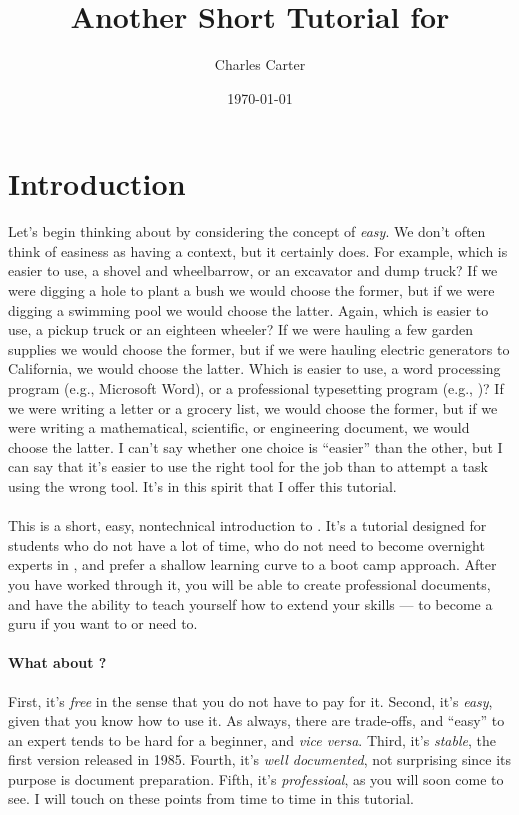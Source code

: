 \documentclass[letterpaper]{article}
\title{Another Short Tutorial for \LaTeXe}
\author{Charles Carter}
\date{\today{}}
\newcommand{\Lx}{\LaTeXe}
\begin{document}
    \maketitle{}
    
    \tableofcontents{}
    \listoffigures{}
    \listoftables{}

    \newpage{}

    \section{Introduction}
    \label{Introduction}

    Let's begin thinking about \Lx{}  by considering the concept of \textit{easy}. We don't often think of easiness as having a context, but it certainly does. For example, which is easier to use, a shovel and wheelbarrow, or an excavator and dump truck? If we were digging a hole to plant a bush we would choose the former, but if we were digging a swimming pool we would choose the latter. Again, which is easier to use, a pickup truck or an eighteen wheeler? If we were hauling a few garden supplies we would choose the former, but if we were hauling electric generators to California, we would choose the latter. Which is easier to use, a word processing program (e.g., Microsoft Word), or a professional typesetting program (e.g., \Lx{})? If we were writing a letter or a grocery list, we would choose the former, but if we were writing a mathematical, scientific, or engineering document, we would choose the latter. I can't say whether one choice is ``easier'' than the other, but I can say that it's easier to use the right tool for the job than to attempt a task using the wrong tool. It's in this spirit that I offer this tutorial. 

    \paragraph{}This is a short, easy, nontechnical introduction to \LaTeXe{}. It's a tutorial designed for students who do not have a lot of time, who do not need to become overnight experts in \LaTeXe{}, and prefer a shallow learning curve to a boot camp approach.  After you have worked through it, you will be able to create professional documents, and have the ability to teach yourself how to extend your \LaTeXe{} skills --- to become a \LaTeXe{} guru if you want to or need to.

    \paragraph{What about \LaTeXe{}?}First, it's \textit{free} in the sense that you do not have to pay for it. Second, it's \textit{easy}, given that you know how to use it. As always, there are trade-offs, and ``easy'' to an expert tends to be hard for a beginner, and \textit{vice versa}. Third, it's \textit{stable}, the first version released in 1985. Fourth, it's \textit{well documented}, not surprising since its purpose is document preparation. Fifth, it's \textit{professioal}, as you will soon come to see. I will touch on these points from time to time in this tutorial.
\end{document}
